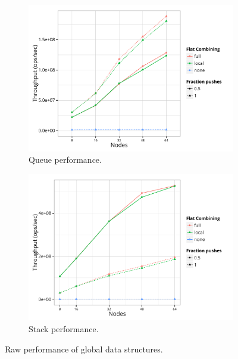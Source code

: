 \begin{figure}[t]
  \centering
  \begin{subfigure}[b]{0.45\textwidth}
  \centering
  \includegraphics[width=\textwidth]{data/plots/queue_perf.pdf}
  \caption{Queue performance.}
  \label{fig:queue}
  \end{subfigure}%
  \hspace{0.05\textwidth}
  \begin{subfigure}[b]{0.45\textwidth}
  \centering
  \includegraphics[width=\textwidth]{data/plots/stack_perf.pdf}
  \caption{Stack performance.}
  \label{fig:stack}
  \end{subfigure}
  \caption{Raw performance of global data structures.}\label{fig:datastructs}
\end{figure}

